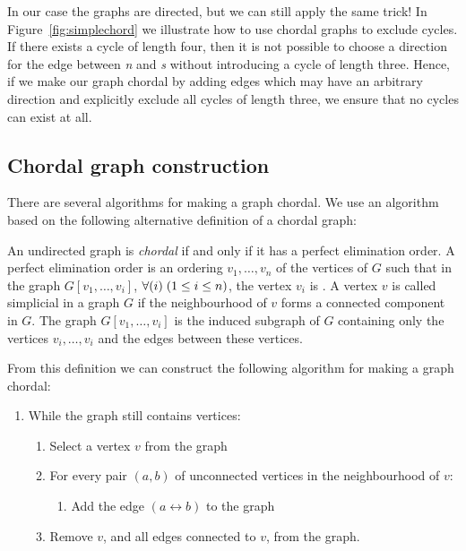 \documentclass{llncs}
\newcommand{\figref}[1]{Figure~\ref{#1}}
\begin{document}
In our case the graphs are directed, but we can still apply the same trick! In \figref{fig:simplechord} we illustrate how to use chordal graphs to exclude cycles. If there exists a cycle of length four, then it is not possible to choose a direction for the edge between \emph{n} and \emph{s} without introducing a cycle of length three. Hence, if we make our graph chordal by adding edges which may have an arbitrary direction and explicitly exclude all cycles of length three, we ensure that no cycles can exist at all.

\subsection{Chordal graph construction} \label{sect:chordalconstruct}
There are several algorithms for making a graph chordal. We use an algorithm based on the following alternative definition of a chordal graph:

\begin{definition}
An undirected graph is \emph{chordal} if and only if it has a 
perfect elimination order. A perfect elimination order is an
ordering $v_1,\ldots,v_n$ of the vertices of $G$ such that in the graph
$G[v_1,\ldots,v_i]$, $\forall(i)\;(1 \leq i \leq n)$, the vertex $v_i$ is 
. A vertex $v$ is called simplicial in a graph $G$ if
the neighbourhood of $v$ forms a connected component in $G$.
The graph $G[v_1,\ldots,v_i]$ is the induced subgraph of $G$ containing
only the vertices $v_i,\ldots,v_i$ and the edges between these vertices.
\end{definition}

From this definition we can construct the following algorithm for making a graph chordal:
\begin{enumerate}
 \item While the graph still contains vertices:
 \begin{enumerate}
     \item Select a vertex $v$ from the graph
     \item For every pair $(a,b)$ of unconnected vertices in the neighbourhood
        of $v$: 
        \begin{enumerate}
            \item Add the edge $(a\leftrightarrow b)$ to the graph
        \end{enumerate}
     \item Remove $v$, and all edges connected to $v$, from the graph.
 \end{enumerate}
\end{enumerate}
\end{document}
